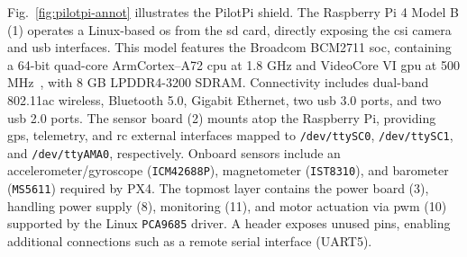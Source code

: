 Fig.~\ref{fig:pilotpi-annot} illustrates the PilotPi shield.
The Raspberry Pi 4 Model B (1) operates a Linux-based \gls{os}
from the \gls{sd} card, directly exposing the \gls{csi} camera and
\gls{usb} interfaces. This model features the Broadcom BCM2711
\gls{soc}, containing a 64-bit quad-core Arm\textreg Cortex\textreg--A72 \gls{cpu} at
1.8 GHz and VideoCore VI \gls{gpu} at 500 MHz~\cite{rpi4-specs,rpi4-bcm2711},
with 8 GB LPDDR4-3200 SDRAM. Connectivity includes dual-band 802.11ac wireless,
Bluetooth 5.0, Gigabit Ethernet, two \gls{usb} 3.0 ports, and two \gls{usb} 2.0 ports.
%
The sensor board (2) mounts atop the Raspberry Pi,
providing \gls{gps}, telemetry, and \gls{rc} external interfaces mapped to
\lstinline{/dev/ttySC0}, \lstinline{/dev/ttySC1}, and \lstinline{/dev/ttyAMA0},
respectively. Onboard sensors include an accelerometer/gyroscope
(\lstinline{ICM42688P}), magnetometer (\lstinline{IST8310}), and barometer
(\lstinline{MS5611}) required by PX4.
%
The topmost layer contains the power board (3), handling power supply (8),
monitoring (11), and motor actuation via \gls{pwm} (10) supported by the Linux
\lstinline{PCA9685} driver. A header exposes unused pins, enabling additional
connections such as a remote serial interface (UART5).



  
  
  
